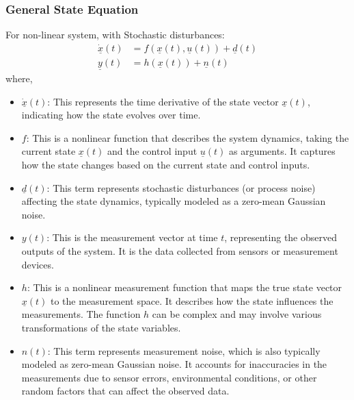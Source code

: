 \subsubsection{General State Equation}
For non-linear system, with Stochastic disturbances:
\begin{equation}
\begin{aligned}
	\dot{\underline{x}}(t) &= f\left( \underline{x}(t), \underline{u}(t) \right) + \underline{d}(t) \\
	\underline{y}(t) &= h\left( \underline{x}(t) \right) + \underline{n}(t)
\end{aligned}
\end{equation}
where,
\begin{itemize}
	\item $ \dot{\underline{x}}(t) $: This represents the time derivative of the state vector $ \underline{x}(t) $, indicating how the state evolves over time.
	\item $ f $: This is a nonlinear function that describes the system dynamics, taking the current state $ \underline{x}(t) $ and the control input $ \underline{u}(t) $ as arguments. It captures how the state changes based on the current state and control inputs.
	\item $ \underline{d}(t) $: This term represents stochastic disturbances (or process noise) affecting the state dynamics, typically modeled as a zero-mean Gaussian noise.
	\item $ y(t) $: This is the measurement vector at time $ t $, representing the observed outputs of the system. It is the data collected from sensors or measurement devices.
	\item $ h $: This is a nonlinear measurement function that maps the true state vector $ \underline{x}(t) $ to the measurement space. It describes how the state influences the measurements. The function $ h $ can be complex and may involve various transformations of the state variables.
	\item $ n(t) $: This term represents measurement noise, which is also typically modeled as zero-mean Gaussian noise. It accounts for inaccuracies in the measurements due to sensor errors, environmental conditions, or other random factors that can affect the observed data.
\end{itemize}

